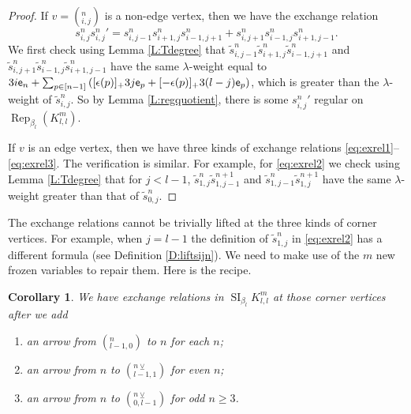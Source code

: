 \documentclass{amsart}
\newtheorem{corollary}[theorem]{Corollary}
\theoremstyle{definition}
\theoremstyle{remark}
\numberwithin{equation}{section}
\DeclareMathOperator{\Rep}{Rep}
\DeclareMathOperator{\SI}{SI}
\newcommand{\wtd}[1]{\widetilde{#1}}
\newcommand{\e}{{\sf e}}
\newcommand{\kllm}{{K_{l,l}^m}}
\newcommand{\bl}{{\beta_l}}
\newcommand{\ijn}{_{i,j}^{n}}
\begin{document}
\begin{proof} If $v=(\ijn)$ is a non-edge vertex, then we have the exchange relation
	$$s\ijn {s\ijn}' = s_{i,j-1}^ns_{i+1,j}^ns_{i-1,j+1}^n+s_{i,j+1}^ns_{i-1,j}^ns_{i+1,j-1}^n.$$
We first check using Lemma \ref{L:Tdegree} that $\wtd{s}_{i,j-1}^n\wtd{s}_{i+1,j}^n\wtd{s}_{i-1,j+1}^n$ and $\wtd{s}_{i,j+1}^n\wtd{s}_{i-1,j}^n\wtd{s}_{i+1,j-1}^n$ have the same $\lambda$-weight equal to $3i\e_n+\sum_{p\in [n-1]} \left([\epsilon(p)]_+3j\e_p + [-\epsilon(p)]_+3(l-j)\e_p \right)$, which is greater than the $\lambda$-weight of 
$\wtd{s}\ijn$. So by Lemma \ref{L:regquotient}, there is some ${s\ijn}'$ regular on $\Rep_\bl(\kllm)$.

If $v$ is an edge vertex, then we have three kinds of exchange relations \eqref{eq:exrel1}--\eqref{eq:exrel3}.
The verification is similar. For example, for \eqref{eq:exrel2} we check using Lemma \ref{L:Tdegree} that for $j<l-1$, $\wtd{s}_{1,j}^n \wtd{s}_{1,j-1}^{n+1}$ and $\wtd{s}_{1,j-1}^{n} \wtd{s}_{1,j}^{n+1}$ have the same $\lambda$-weight greater than that of $\wtd{s}_{0,j}^n$.
\end{proof}

\noindent The exchange relations cannot be trivially lifted at the three kinds of corner vertices.
For example, when $j=l-1$ the definition of $\wtd{s}_{1,j}^n$ in \eqref{eq:exrel2} has a different formula (see Definition \ref{D:liftsijn}).
We need to make use of the $m$ new frozen variables to repair them. Here is the recipe.


\begin{corollary} \label{C:exrellift2} We have exchange relations in $\SI_\bl{\kllm}$ at those corner vertices after we add \begin{enumerate}
\item  an arrow from $(_{l-1,0}^n)$ to $n$ for each $n$;
\item  an arrow from $n$ to $(_{l-1,1}^{n\veebar})$ for even $n$;
\item  an arrow from $n$ to $(_{0,l-1}^{n\veebar})$ for odd $n\geq 3$.
\end{enumerate}
\end{corollary}
\end{document}
